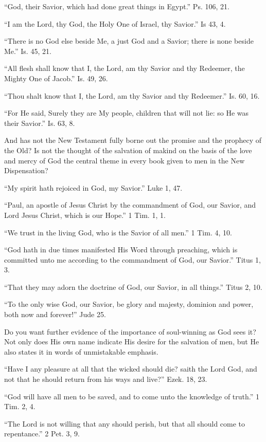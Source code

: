 \documentclass[
]{book}
\begin{document}
``God, their Savior, which had done great things in Egypt.'' Ps. 106, 21.

``I am the Lord, thy God, the Holy One of Israel, thy Savior.'' Is 43, 4.

``There is no God else beside Me, a just God and a Savior; there is none beside Me.'' Is. 45, 21.

``All flesh shall know that I, the Lord, am thy Savior and thy Redeemer, the Mighty One of Jacob.'' Is. 49, 26.

``Thou shalt know that I, the Lord, am thy Savior and thy Redeemer.'' Is. 60, 16.

``For He said, Surely they are My people, children that will not lie: so He was their Savior.'' Is. 63, 8.

And has not the New Testament fully borne out the promise and the prophecy of the Old? Is not the thought of the salvation of makind on the basis of the love and mercy of God the central theme in every book given to men in the New Dispensation?

``My spirit hath rejoiced in God, my Savior.'' Luke 1, 47.

``Paul, an apostle of Jesus Christ by the commandment of God, our Savior, and Lord Jesus Christ, which is our Hope.'' 1 Tim. 1, 1.

``We trust in the living God, who is the Savior of all men.'' 1 Tim. 4, 10.

``God hath in due times manifested His Word through preaching, which is committed unto me according to the commandment of God, our Savior.'' Titus 1, 3.

``That they may adorn the doctrine of God, our Savior, in all things.'' Titus 2, 10.

``To the only wise God, our Savior, be glory and majesty, dominion and power, both now and forever!'' Jude 25.

Do you want further evidence of the importance of soul-winning as God sees it? Not only does His own name indicate His desire for the salvation of men, but He also states it in words of unmistakable emphasis.

``Have I any pleasure at all that the wicked should die? saith the Lord God, and not that he should return from his ways and live?'' Ezek. 18, 23.

``God will have all men to be saved, and to come unto the knowledge of truth.'' 1 Tim. 2, 4.

``The Lord is not willing that any should perish, but that all should come to repentance.'' 2 Pet. 3, 9.
\end{document}
